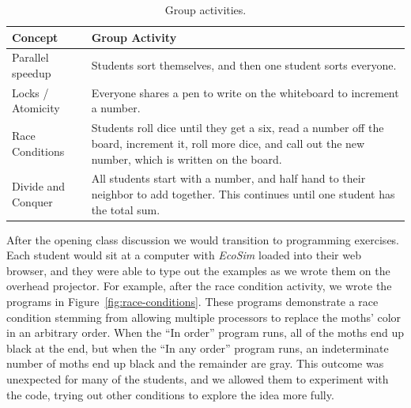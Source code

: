 \documentclass{sig-alternate}
\begin{document}
\begin{table}
\centering \begin{tabular}{p{.25\linewidth}p{.7\linewidth}} 
\toprule
Concept & Group Activity \\ \midrule
Parallel speedup & Students sort themselves, and then one student sorts everyone.\\ \hline
Locks / Atomicity & Everyone shares a pen to write on the whiteboard to increment a number.  \\ \hline
Race Conditions & Students roll dice until they get a six, read a number off the board, increment it, roll more dice, and call out the new number, which is written on the board. \\ \hline
Divide and Conquer & All students start with a number, and half hand to their neighbor to add together. This continues until one student has the total sum. \\
\bottomrule 
\end{tabular}
\vspace{-0.8em}
\caption{Group activities.}
\vspace{-1em}
\label{tab:group-activities}
\end{table} 

After the opening class discussion we would transition to programming exercises.
Each student would sit at a computer with \emph{EcoSim} loaded into their
web browser, and they were able to type out the examples as we wrote them on the overhead projector.
For example, after the race condition activity, we wrote the programs in Figure~\ref{fig:race-conditions}. 
These programs demonstrate a race condition stemming from allowing multiple
processors to replace the moths' color in an arbitrary order.  When the ``In order'' program runs,
all of the moths end up black at the end, but when the ``In any order'' program runs, an
indeterminate number of moths end up black and the remainder are gray.
This outcome was unexpected for many of the students, and we allowed them to experiment with the code, 
trying out other conditions to explore the idea more fully.
     
\end{document}
